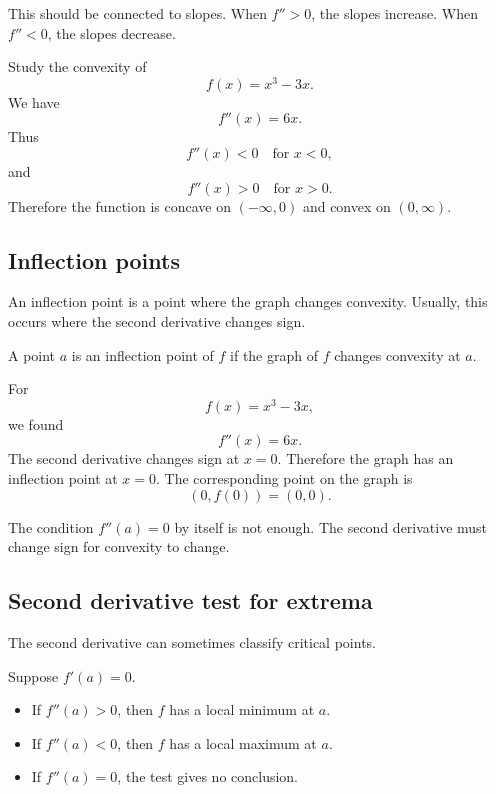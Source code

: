 This should be connected to slopes. When \(f''>0\), the slopes increase. When \(f''<0\), the slopes decrease.

\begin{examplebox}
Study the convexity of
\[
f(x)=x^3-3x.
\]
We have
\[
f''(x)=6x.
\]
Thus
\[
f''(x)<0 \quad\text{for } x<0,
\]
and
\[
f''(x)>0 \quad\text{for } x>0.
\]
Therefore the function is concave on \(( -\infty,0)\) and convex on \((0,\infty)\).
\end{examplebox}

\subsection*{Inflection points}

An inflection point is a point where the graph changes convexity. Usually, this occurs where the second derivative changes sign.

\begin{definitionbox}
A point \(a\) is an inflection point of \(f\) if the graph of \(f\) changes convexity at \(a\).
\end{definitionbox}

\begin{examplebox}
For
\[
f(x)=x^3-3x,
\]
we found
\[
f''(x)=6x.
\]
The second derivative changes sign at \(x=0\). Therefore the graph has an inflection point at \(x=0\). The corresponding point on the graph is
\[
(0,f(0))=(0,0).
\]
\end{examplebox}

The condition \(f''(a)=0\) by itself is not enough. The second derivative must change sign for convexity to change.

\subsection*{Second derivative test for extrema}

The second derivative can sometimes classify critical points.

\begin{theorembox}
Suppose \(f'(a)=0\).
\begin{itemize}
\item If \(f''(a)>0\), then \(f\) has a local minimum at \(a\).
\item If \(f''(a)<0\), then \(f\) has a local maximum at \(a\).
\item If \(f''(a)=0\), the test gives no conclusion.
\end{itemize}
\end{theorembox}

